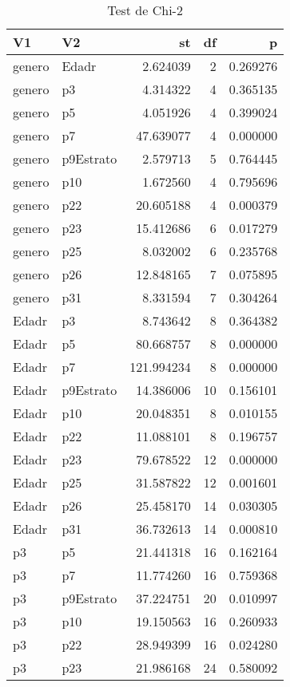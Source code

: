 \begin{table}

\caption{Test de Chi-2}
\centering
\begin{tabular}[t]{l|l|r|r|r}
\hline
V1 & V2 & st & df & p\\
\hline
genero & Edadr & 2.624039 & 2 & 0.269276\\
\hline
genero & p3 & 4.314322 & 4 & 0.365135\\
\hline
genero & p5 & 4.051926 & 4 & 0.399024\\
\hline
genero & p7 & 47.639077 & 4 & 0.000000\\
\hline
genero & p9Estrato & 2.579713 & 5 & 0.764445\\
\hline
genero & p10 & 1.672560 & 4 & 0.795696\\
\hline
genero & p22 & 20.605188 & 4 & 0.000379\\
\hline
genero & p23 & 15.412686 & 6 & 0.017279\\
\hline
genero & p25 & 8.032002 & 6 & 0.235768\\
\hline
genero & p26 & 12.848165 & 7 & 0.075895\\
\hline
genero & p31 & 8.331594 & 7 & 0.304264\\
\hline
Edadr & p3 & 8.743642 & 8 & 0.364382\\
\hline
Edadr & p5 & 80.668757 & 8 & 0.000000\\
\hline
Edadr & p7 & 121.994234 & 8 & 0.000000\\
\hline
Edadr & p9Estrato & 14.386006 & 10 & 0.156101\\
\hline
Edadr & p10 & 20.048351 & 8 & 0.010155\\
\hline
Edadr & p22 & 11.088101 & 8 & 0.196757\\
\hline
Edadr & p23 & 79.678522 & 12 & 0.000000\\
\hline
Edadr & p25 & 31.587822 & 12 & 0.001601\\
\hline
Edadr & p26 & 25.458170 & 14 & 0.030305\\
\hline
Edadr & p31 & 36.732613 & 14 & 0.000810\\
\hline
p3 & p5 & 21.441318 & 16 & 0.162164\\
\hline
p3 & p7 & 11.774260 & 16 & 0.759368\\
\hline
p3 & p9Estrato & 37.224751 & 20 & 0.010997\\
\hline
p3 & p10 & 19.150563 & 16 & 0.260933\\
\hline
p3 & p22 & 28.949399 & 16 & 0.024280\\
\hline
p3 & p23 & 21.986168 & 24 & 0.580092\\

\end{tabular}
\end{table}
